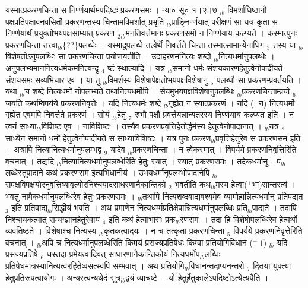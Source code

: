 \documentclass[article,12pt,a4paper]{memoir}%
\newcommand{\add}[1]{($^{+}$#1)}
\begin{document}
	  
	  \pstart \leavevmode%
	\hphantom{.}यस्मात्प्रकरणचिन्ता स निर्ण्णयार्थमपदिष्टः प्रकरणसमः । \href{http://sarit.indology.info/?cref=ns\%C5\%AB.1.2.7}{न्या० सू० १।२।७ } {\tiny $_{lb}$} विमर्शाधिष्ठानौ पक्षप्रतिपक्षावनवसितौ प्रकरणन्तस्य चिन्तामविमर्शात् प्रभृति {\tiny $_{lb}$}प्राङ्निर्ण्णयात् परीक्षणं सा यत्र कृता स निर्ण्णयार्थं प्रयुक्तोभयपक्षसाम्यात् प्रकरण {\tiny $_{2}$}{\tiny $_{lb}$}मनतिवर्त्तमानः प्रकरणसमो न निर्ण्णयाय कल्प्यते । कस्मात्पुनः प्रकरणचिन्ता तत्त्वा{\tiny $_{lb}$}\{??\}पलब्धेः । यस्मादुपलब्धे तत्वेर्थे निवर्त्तते चिन्ता तस्मात्सामान्येनाधिग {\tiny $_{3}$} तस्य या {\tiny $_{lb}$} \leavevmode{} विशेषतोऽनुपलब्धिः सा प्रकरणचिन्तां प्रयोजयतीति । उदाहरणमनित्यः शब्दो {\tiny $_{lb}$}नित्यधर्मानुपलब्धेः । अनुपलभ्यमाननित्यधर्मकमनित्यन्दृ {\tiny $_{4}$} ष्टं स्थाल्यादि । यत्र {\tiny $_{lb}$}समानो धर्मः संशयकारणहेतुत्वेनोपादीयते संशयसमः सव्यभिचार एव । या तु {\tiny $_{lb}$}विमर्शस्य विशेषापेक्षतोभयपक्षविशेषानु {\tiny $_{5}$} पलब्धौ सा प्रकरणम्प्रवर्तयति । यथा {\tiny $_{lb}$}च शब्दे नित्यधर्मो नोपलभ्यते तथानित्यधर्मोपि । सेयमुभयपक्षविशेषानुपलब्धिः {\tiny $_{lb}$}प्रकरणचिन्ताम्प्रयो {\tiny $_{6}$} जयति कथम्विपर्यये प्रकरणनिवृत्तेः । यदि नित्यधर्मः शब्दे {\tiny $_{lb}$}गृह्येत न स्यात्प्रकरणं । यदि \add{न} नित्यधर्मो गृह्येत एवमपि निवर्त्तते प्रकरणं । सोयं {\tiny $_{lb}$}हेतु {\tiny $_{7}$} रुभौ पक्षौ प्रवर्त्तयन्नान्यतरस्य निर्ण्णयाय कल्प्यत इति । न त्वयं साध्या{\tiny $_{lb}$}विशिष्ट एव । नाविशिष्टः । तस्यैव प्रकरणप्रवृत्तिहेतोर्द्धर्मस्य हेतुत्वेनोपादानात् । {\tiny $_{lb}$}यत्र {\tiny $_{8}$} साध्येन समानो धर्मो हेतुत्वेनोपादीयते स साध्याविशिष्टः । यत्र पुनः प्रकरण{\tiny $_{lb}$}प्रवृत्तिहेतुरेव स प्रकरणसम इति । अत्रापि नित्यानित्यधर्मानुपलम्भद्व {\tiny $_{9}$} \leavevmode{} यादेव {\tiny $_{lb}$}प्रकरणचिन्ता । न त्वेकस्मात् । विपर्यये प्रकरणनिवृत्तिरिति वचनात् । तद्यदि {\tiny $_{lb}$}नित्यानित्यधर्मानुपलब्धेरिति हेतुः स्यात् । स्यात् प्रकरणसमः । तदेकधर्मानु {\tiny $_{1}$} प{\tiny $_{lb}$}लब्धेस्तूपादाने कथं प्रकरणसम इत्यभिधानीयं । उभयधर्मानुपलम्भोपादानेपि {\tiny $_{lb}$}सपक्षविपक्षयोरनुवृत्तिव्यावृत्योरनिश्चयादसाधरणानैकान्तिको {\tiny $_{2}$} भवतीति कथ{\tiny $_{lb}$}मस्य हेत्वा\add{भा}सान्तरत्वं । भवतु नामैकधर्मानुपलब्धिरेव हेतुः प्रकरणसमः । {\tiny $_{lb}$}तथापि नित्यशब्दवाद्यवश्यमेव व्यामोहान्नित्यधर्मान् प्रतिपद्यत {\tiny $_{3}$} इति प्रतिवाद्य{\tiny $_{lb}$}सिद्धीयं भवति । अथ प्रमाणेन नित्यधर्म्मप्रतिक्षेपान्नित्यधर्मानुपलब्धिः प्रति{\tiny $_{lb}$}पाद्यते । तदापि निश्चायकत्वात् सम्यग्ज्ञानहेतुरेवायं {\tiny $_{4}$} इति कथं हेत्वाभासः प्रक{\tiny $_{lb}$}रणसमः । तदा हि विशेषोपलब्धिरेव हेत्वर्थो व्यवतिष्ठते । विशेषाश्च नित्यस्य {\tiny $_{lb}$}कृतकत्वादयः । न च तत्कृता प्रकरणचिन्ता {\tiny $_{5}$} विपर्यये प्रकरणनिवृत्तेरिति वचनात् । {\tiny $_{lb}$}अपि च नित्यधर्मानुपलब्धेरिति किमयं प्रसज्यप्रतिषेधः किम्वा प्रतियोगिविधानं \add{।} {\tiny $_{lb}$} यदि प्रसज्यप्रतिषे {\tiny $_{6}$} धस्तदा प्रमेयत्वादिवत् साधारणानैकान्तिकोयं नित्यधर्मोप{\tiny $_{lb}$}लब्धिः प्रतिषेधमात्रस्यानित्यत्वरहितेष्वसत्स्वपि सम्भवात् । अथ प्रतियोगि{\tiny $_{lb}$}विधानन्तदाप्यनन्तरो {\tiny $_{7}$} दितया युक्त्या हेतुप्रतिरूपत्वायोगः । अन्यस्त्वन्यथेदं सूत्र{\tiny $_{lb}$}द्वयं व्याचष्टे । यो हेतुर्हेतुकालेऽपदिष्टोऽत्येत्यपैति । 
\end{document}
